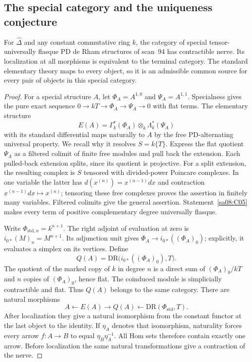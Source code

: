 \subsection{The special category and the uniqueness conjecture}

\begin{theorem}\label{sa08:C06}
For $\widehat\Delta$ and any constant commutative ring $k$, the
category of special tensor-universally flasque PD de Rham structures
of scan~94 has contractible nerve. Its localization at all morphisms
is equivalent to the terminal category. The standard elementary
theory maps to every object, so it is an admissible common source
for every pair of objects in this special category.
\end{theorem}
\begin{proof}
For a special structure $A$, let $\Phi_A=A^{1,0}$ and
$\Psi_A=A^{1,1}$. Specialness gives the pure exact sequence
$0\to kT\to\Phi_A\to\Psi_A\to0$ with flat terms. The elementary
structure
\[
 E(A)=\Gamma_k^*(\Phi_A)\otimes_k\Lambda_k^*(\Psi_A)
\]
with its standard differential maps naturally to $A$ by the free
PD-alternating universal property. We recall why it resolves
$S=k\{T\}$. Express the flat quotient $\Psi_A$ as a filtered
colimit of finite free modules and pull back the extension. Each
pulled-back extension splits, since its quotient is projective.
For a split extension, the resulting complex is $S$ tensored with
divided-power Poincare complexes. In one variable the latter has
$d(x^{(n)})=x^{(n-1)}dx$ and contraction
$x^{(n-1)}dx\mapsto x^{(n)}$; tensoring these free complexes proves
the assertion in finitely many variables. Filtered colimits give the
general assertion. Statement~\ref{sa08:C05} makes every term of
positive complementary degree universally flasque.

Write $\Phi_{\mathrm{std},n}=k^{n+1}$. The right adjoint of
evaluation at zero is $i_{0*}(M)_n=M^{n+1}$. Its adjunction unit gives
$\Phi_A\to i_{0*}((\Phi_A)_0)$; explicitly, it evaluates a simplex
on its vertices. Define
\[
 Q(A)=\mathrm{DR}\bigl(i_{0*}((\Phi_A)_0),T\bigr).
\]
The quotient of the marked copy of $k$ in degree $n$ is a direct sum
of $(\Phi_A)_0/kT$ and $n$ copies of $(\Phi_A)_0$, hence flat.
The coinduced module is simplicially contractible and flat. Thus
$Q(A)$ belongs to the same category. There are natural morphisms
\[
 A\longleftarrow E(A)\longrightarrow Q(A)
 \longleftarrow\mathrm{DR}(\Phi_{\mathrm{std}},T).
\]
After localization they give a natural isomorphism from the
constant functor at the last object to the identity. If
$\eta_A$ denotes that isomorphism, naturality forces every arrow
$f:A\to B$ to equal $\eta_B\eta_A^{-1}$. All Hom sets therefore
contain exactly one arrow. Before localization the same natural
transformations give a contraction of the nerve.


\end{proof}
